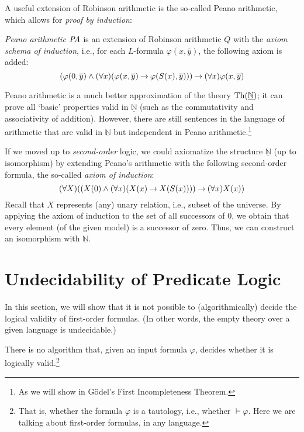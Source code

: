 A useful extension of Robinson arithmetic is the so-called Peano arithmetic, which allows for \emph{proof by induction}:

\begin{definition}
\emph{Peano arithmetic} $\text{\it PA}$ is an extension of Robinson arithmetic $Q$ with the \emph{axiom schema of induction}, i.e., for each $L$-formula $\varphi(x, \overline{y})$, the following axiom is added:
$$
(\varphi(0, \overline{y}) \land (\forall x)(\varphi(x, \overline{y}) \mathbin{\rightarrow} \varphi(S(x), \overline{y}))) \mathbin{\rightarrow} (\forall x)\varphi(x, \overline{y})
$$
\end{definition}

Peano arithmetic is a much better approximation of the theory $\operatorname{Th}(\underline{\mathbb{N}})$; it can prove all `basic' properties valid in $\underline{\mathbb{N}}$ (such as the commutativity and associativity of addition). However, there are still sentences in the language of arithmetic that are valid in $\underline{\mathbb{N}}$ but independent in Peano arithmetic.\footnote{As we will show in Gödel's First Incompleteness Theorem.} 


\begin{remark}
    If we moved up to \emph{second-order} logic, we could axiomatize the structure $\underline{\mathbb N}$ (up to isomorphism) by extending Peano's arithmetic with the following second-order formula, the so-called \emph{axiom of induction}:
    $$
    (\forall X)((X(0) \land (\forall x)(X(x) \mathbin{\rightarrow} X(S(x)))) \mathbin{\rightarrow} (\forall x)X(x))
    $$
    Recall that $X$ represents (any) unary relation, i.e., subset of the universe. By applying the axiom of induction to the set of all successors of 0, we obtain that every element (of the given model) is a successor of zero. Thus, we can construct an isomorphism with $\underline{\mathbb N}$.
    \end{remark}
    
    \section{Undecidability of Predicate Logic}
    
    In this section, we will show that it is not possible to (algorithmically) decide the logical validity of first-order formulas. (In other words, the empty theory over a given language is undecidable.)
    
    \begin{theorem}\label{theorem:undecidability-of-predicate-logic}
    There is no algorithm that, given an input formula $\varphi$, decides whether it is logically valid.\footnote{That is, whether the formula $\varphi$ is a tautology, i.e.,  whether $\models\varphi$. Here we are talking about first-order formulas, in any language.}
    \end{theorem}
    

